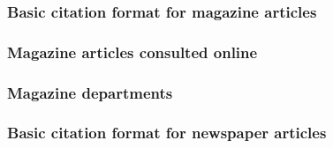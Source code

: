 \documentclass[11pt,letterpaper,oneside]{article}
\begin{document}
\begin{citebib}
\item \cite{matute2015}
\end{citebib}

\setcounter{subsubsection}{187}
\subsubsection{Basic citation format for magazine articles}

\begin{citebib}
\item \cite[48]{saulnier2008}
\item \cite[59]{lepore2015}
\end{citebib}

\subsubsection{Magazine articles consulted online}

\begin{citebib}
\item \cite{vick2015}
\item \cite[5]{hanemann1926}
\end{citebib}

\subsubsection{Magazine departments}

\begin{citebib}
\item \cite{marx2015}
\item \cite{wallraff2008}
\item \cite{gourmet2000}
\end{citebib}

\subsubsection{Basic citation format for newspaper articles}

\begin{citebib}
\item \cite{editorial1990}
\item \cite{royko1992}
\item \cite{forester2000}
\item \cite{samenow2016}
\end{citebib}
\end{document}
